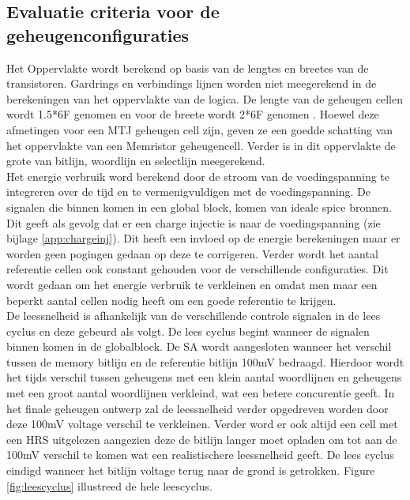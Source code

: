 \subsection{Evaluatie criteria voor de geheugenconfiguraties}
Het Oppervlakte wordt berekend op basis van de lengtes en breetes van de transistoren. Gardrings en verbindings lijnen worden niet meegerekend in de berekeningen van het oppervlakte van de logica. De lengte van de geheugen cellen wordt 1.5*6F genomen en voor de breete wordt 2*6F genomen \cite{ppt:cosemans}. Hoewel deze afmetingen voor een MTJ geheugen cell zijn, geven ze een goedde schatting van het oppervlakte van een Memristor geheugencell. Verder is in dit oppervlakte de grote van bitlijn, woordlijn en selectlijn meegerekend. \\
Het energie verbruik word berekend door de stroom van de voedingspanning te integreren over de tijd en te vermenigvuldigen met de voedingspanning. De signalen die binnen komen in een global block, komen van ideale spice bronnen. Dit geeft als gevolg dat er een charge injectie is naar de voedingspanning (zie bijlage \ref{app:chargeinj}). Dit heeft een invloed op de energie berekeningen maar er worden geen pogingen gedaan op deze te corrigeren. Verder wordt het aantal referentie cellen ook constant gehouden voor de verschillende configuraties. Dit wordt gedaan om het energie verbruik te verkleinen en omdat men maar een beperkt aantal cellen nodig heeft om een goede referentie te krijgen.\\
De leessnelheid is afhankelijk van de verschillende controle signalen in de lees cyclus en deze gebeurd als volgt. De lees cyclus begint wanneer de signalen binnen komen in de globalblock. De SA wordt aangesloten wanneer het verschil tussen de memory bitlijn en de referentie bitlijn 100mV bedraagd. Hierdoor wordt het tijds verschil tussen geheugens met een klein aantal woordlijnen en geheugens met een groot aantal woordlijnen verkleind, wat een betere concurentie geeft. In het finale geheugen ontwerp zal de leessnelheid verder opgedreven worden door deze 100mV voltage verschil te verkleinen. Verder word er ook altijd een cell met een HRS uitgelezen aangezien deze de bitlijn langer moet opladen om tot aan de 100mV verschil te komen wat een realistischere leessnelheid geeft. De lees cyclus eindigd wanneer het bitlijn voltage terug naar de grond is getrokken. Figure \ref{fig:leescyclus} illustreed de hele leescyclus.

